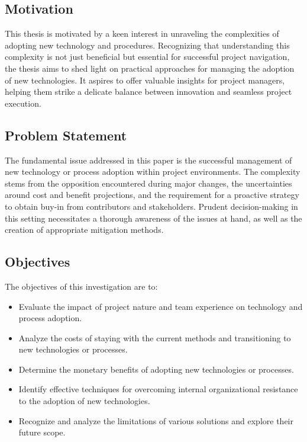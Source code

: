\documentclass{article}
\begin{document}
\subsection{Motivation}
This thesis is motivated by a keen interest in unraveling the complexities of adopting new technology and procedures. Recognizing that understanding this complexity is not just beneficial but essential for successful project navigation, the thesis aims to shed light on practical approaches for managing the adoption of new technologies. It aspires to offer valuable insights for project managers, helping them strike a delicate balance between innovation and seamless project execution.

\subsection{Problem Statement}
The fundamental issue addressed in this paper is the successful management of new technology or process adoption within project environments. The complexity stems from the opposition encountered during major changes, the uncertainties around cost and benefit projections, and the requirement for a proactive strategy to obtain buy-in from contributors and stakeholders. Prudent decision-making in this setting necessitates a thorough awareness of the issues at hand, as well as the creation of appropriate mitigation methods.

\subsection{Objectives}

The objectives of this investigation are to:
\begin{itemize}
  \item Evaluate the impact of project nature and team experience on technology and process adoption.
  \item Analyze the costs of staying with the current methods and transitioning to new technologies or processes.
  \item Determine the monetary benefits of adopting new technologies or processes.
  \item Identify effective techniques for overcoming internal organizational resistance to the adoption of new technologies.
  \item Recognize and analyze the limitations of various solutions and explore their future scope.
\end{itemize}
\end{document}
